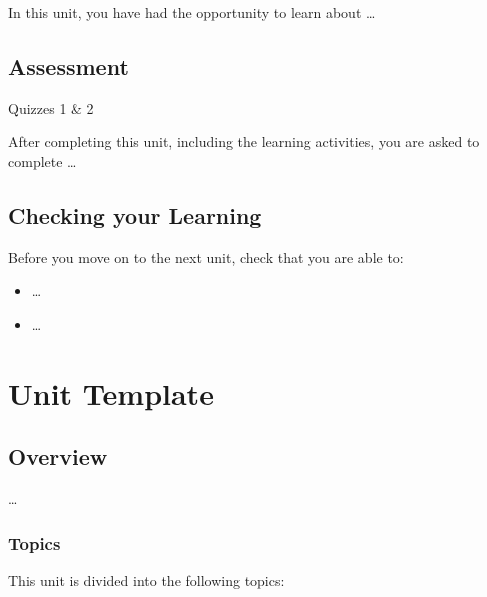 \documentclass[
]{book}
\providecommand{\tightlist}{%
  \setlength{\itemsep}{0pt}\setlength{\parskip}{0pt}}
\theoremstyle{definition}
\theoremstyle{definition}
\theoremstyle{definition}
\theoremstyle{definition}
\theoremstyle{remark}
\begin{document}
In this unit, you have had the opportunity to learn about \ldots{}

\hypertarget{assessment-5}{%
\section*{Assessment}\label{assessment-5}}

\begin{assessment}
{Quizzes 1 \& 2}

After completing this unit, including the learning activities, you are asked to complete \ldots{}
\end{assessment}

\hypertarget{checking-your-learning-5}{%
\section*{Checking your Learning}\label{checking-your-learning-5}}

\begin{progress}
Before you move on to the next unit, check that you are able to:

\begin{itemize}
\tightlist
\item
  \ldots{}
\item
  \ldots{}
\end{itemize}
\end{progress}

\hypertarget{unit-template}{%
\chapter{Unit Template}\label{unit-template}}

\hypertarget{overview-6}{%
\section*{Overview}\label{overview-6}}

\ldots{}

\hypertarget{topics-6}{%
\subsection*{Topics}\label{topics-6}}

This unit is divided into the following topics:
\end{document}
